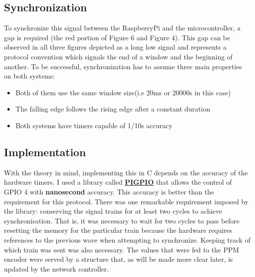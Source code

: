 \documentclass{IEEEtran}
\begin{document}
\subsection*{Synchronization}
To synchronize this signal between the RaspberryPi and the microcontroller, a gap is required (the red portion of Figure 6 and Figure 4). This gap can be observed in all three figures depicted as a long low signal and represents a protocol convention which signals the end of a window and the beginning of another. To be successful, synchronization has to assume three main properties on both systems:
\begin{itemize}
    \item Both of them use the same window size(i.e 20ms or 20000{\mu}s in this case)
    \item The falling edge follows the rising edge after a constant duration
    \item Both systems have timers capable of 1/10{\mu}s accuracy
\end{itemize}

\subsection*{Implementation}
With the theory in mind, implementing this in C depends on the accuracy of the hardware timers. I used a library called \textbf{\hyperlink{http://abyz.me.uk/rpi/pigpio/}{PIGPIO}} that allows the control of GPIO 4 with \textbf{nanosecond} accuracy. This accuracy is better than the requirement for this protocol.
\newline
\newline
There was one remarkable requirement imposed by the library: conserving the signal trains for at least two cycles to achieve synchronisation. That is, it was necessary to wait for two cycles to pass before resetting the memory for the particular train because the hardware requires references to the previous wave when attempting to synchronize. Keeping track of which train was sent was also necessary.
\newline
\newline
The values that were fed to the PPM encoder were served by a structure that, as will be made more clear later, is updated by the network controller.
   
\end{document}
